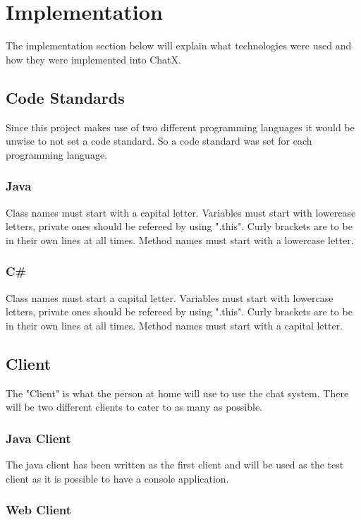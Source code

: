 \chapter{Implementation}

The implementation section below will explain what technologies were used and how they were implemented into ChatX.

\section{Code Standards}
Since this project makes use of two different programming languages it would be unwise to not set a code standard. So a code standard was set for each programming language.

\subsection{Java}
Class names must start with a capital letter.
Variables must start with lowercase letters, private ones should be refereed by using ".this".
Curly brackets are to be in their own lines at all times.
Method names must start with a lowercase letter.


\subsection{C\#}
Class names must start a capital letter.
Variables must start with lowercase letters, private ones should be refereed by using ".this".
Curly brackets are to be in their own lines at all times.
Method names must start with a capital letter.

\section{Client}
The "Client" is what the person at home will use to use the chat system. There will be two different clients to cater to as many as possible.

\subsection{Java Client}

The java client has been written as the first client and will be used as the test client as it is possible to have a console application.

\subsection{Web Client}

